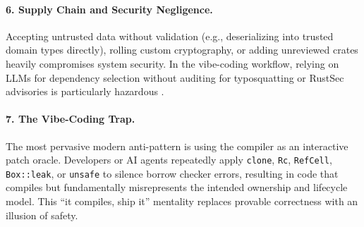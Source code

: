 \paragraph{6. Supply Chain and Security Negligence.}
Accepting untrusted data without validation (e.g., deserializing into trusted domain types directly), rolling custom cryptography, or adding unreviewed crates heavily compromises system security. In the vibe-coding workflow, relying on LLMs for dependency selection without auditing for typosquatting or RustSec advisories is particularly hazardous \cite{rustsec}.

\paragraph{7. The Vibe-Coding Trap.}
The most pervasive modern anti-pattern is using the compiler as an interactive patch oracle. Developers or AI agents repeatedly apply \texttt{clone}, \texttt{Rc}, \texttt{RefCell}, \texttt{Box::leak}, or \texttt{unsafe} to silence borrow checker errors, resulting in code that compiles but fundamentally misrepresents the intended ownership and lifecycle model. This ``it compiles, ship it'' mentality replaces provable correctness with an illusion of safety.
